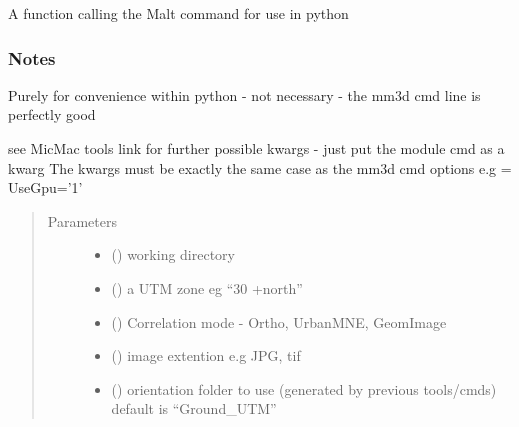 \documentclass[letterpaper,10pt,english]{sphinxmanual}
\begin{document}
\begin{fulllineitems}
\label{\detokenize{pycmac:dense_match.Malt}}
A function calling the Malt command for use in python
\subsubsection*{Notes}

Purely for convenience within python - not  necessary - the mm3d cmd line
is perfectly good

see MicMac tools link for further possible kwargs - just put the module cmd as a kwarg
The kwargs must be exactly the same case as the mm3d cmd options
e.g = UseGpu=’1’
\begin{quote}\begin{description}
\item[{Parameters}] \leavevmode\begin{itemize}
\item {} 
 () \textendash{} working directory

\item {} 
 () \textendash{} a UTM zone eg “30 +north”

\item {} 
 () \textendash{} Correlation mode - Ortho, UrbanMNE, GeomImage

\item {} 
 () \textendash{} image extention e.g JPG, tif

\item {} 
 () \textendash{} orientation folder to use (generated by previous tools/cmds)
default is “Ground\_UTM”

\end{itemize}

\end{description}\end{quote}

\end{fulllineitems}

\end{document}
